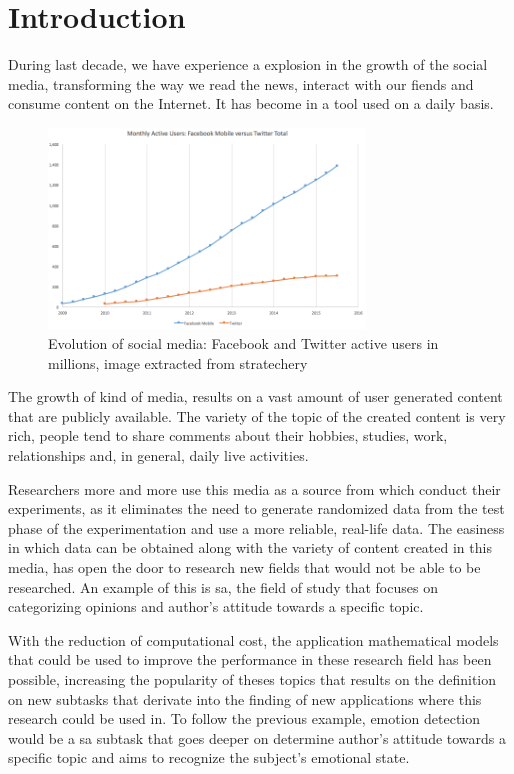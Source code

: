 \chapter{Introduction}
\label{chapter_1}

During last decade, we have experience a explosion in the growth of the social media, transforming the way we read the news, interact with our fiends and consume content on the Internet. It has become in a tool used on a daily basis.

\begin{figure}[!htp]
  \center
  \includegraphics[width=0.75\textwidth]{figures/facebook_twitter_users.png}
  \caption{Evolution of social media: Facebook and Twitter active users in millions, image extracted from stratechery}
  \label{fig:social media evolution}
\end{figure}

The growth of kind of media, results on a vast amount of user generated content that are publicly available. The variety of the topic of the created content is very rich, people tend to share comments about their hobbies, studies, work, relationships and, in general, daily live activities.

Researchers more and more use this media as a source from which conduct their experiments, as it eliminates the need to generate randomized data from the test phase of the experimentation and use a more reliable, real-life data. The easiness in which data can be obtained along with the variety of content created in this media, has open the door to research new fields that would not be able to be researched. An example of this is \acrlong{sa}, the field of study that focuses on categorizing opinions and author's attitude towards a specific topic.

With the reduction of computational cost, the application mathematical models that could be used to improve the performance in these research field has been possible, increasing the popularity of theses topics that results on the definition on new subtasks that derivate into the finding of new applications where this research could be used in. To follow the previous example, emotion detection would be a \acrlong{sa} subtask that goes deeper on determine author's attitude towards a specific topic and aims to recognize the subject's emotional state.


